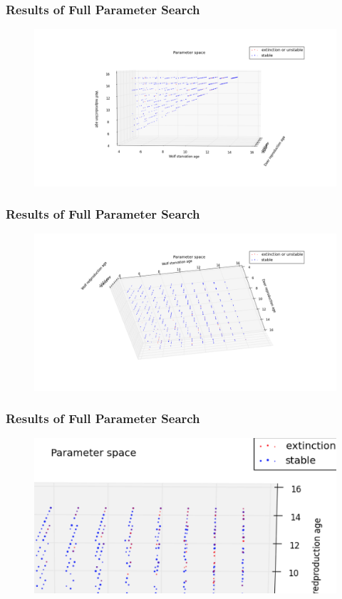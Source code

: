 \documentclass{beamer}
\begin{document}
\frame
{
  \frametitle{Results of Full Parameter Search}
  \begin{figure}[H]
	\includegraphics[width = 1\textwidth]{./pics/Eco_All_param_wage_v_wstarve.png}
  \end{figure}
}
                
\frame
{
  \frametitle{Results of Full Parameter Search}
  \begin{figure}[H]
	\includegraphics[width = 1\textwidth]{./pics/Eco_All_param_wstarve_v_drep.png}
  \end{figure}

}

\frame
{
  \frametitle{Results of Full Parameter Search}
  \begin{figure}[H]
        \includegraphics[width = 1\textwidth]{./pics/Zoomedin_3D.png}
  \end{figure}
}
\end{document}
